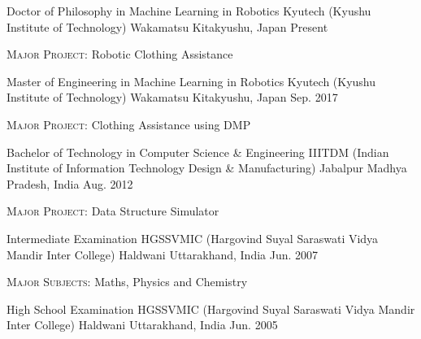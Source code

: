 

\begin{cventries}

  \cventry
    {Doctor of Philosophy in Machine Learning in Robotics} %
    {Kyutech (Kyushu Institute of Technology) Wakamatsu} %
    {Kitakyushu, Japan} %
    {Present} %
    {
      \begin{cvitems} %
        \item \textsc{Major Project:} Robotic Clothing Assistance
      \end{cvitems}
    }

  \cventry
    {Master of Engineering in Machine Learning in Robotics} %
    {Kyutech (Kyushu Institute of Technology) Wakamatsu} %
    {Kitakyushu, Japan} %
    {Sep. 2017} %
    {
      \begin{cvitems} %
        \item \textsc{Major Project:} Clothing Assistance using DMP
      \end{cvitems}
    }

  \cventry
    {Bachelor of Technology in Computer Science \& Engineering} %
    {IIITDM (Indian Institute of Information Technology Design \& Manufacturing) Jabalpur} %
    {Madhya Pradesh, India} %
    {Aug. 2012} %
    {
      \begin{cvitems} %
        \item \textsc{Major Project:} Data Structure Simulator
      \end{cvitems}
    }

  \cventry
    {Intermediate Examination} %
    {HGSSVMIC (Hargovind Suyal Saraswati Vidya Mandir Inter College) Haldwani} %
    {Uttarakhand, India} %
    {Jun. 2007} %
    {
      \begin{cvitems} %
        \item \textsc{Major Subjects:} Maths, Physics and Chemistry
      \end{cvitems}
    }

  \cventry
    {High School Examination} %
    {HGSSVMIC (Hargovind Suyal Saraswati Vidya Mandir Inter College) Haldwani} %
    {Uttarakhand, India} %
    {Jun. 2005} %
    {} %

\end{cventries}
